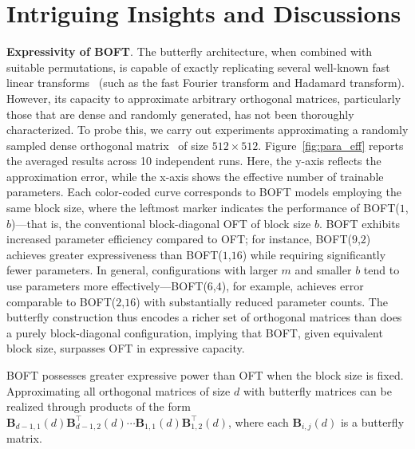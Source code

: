 \section{Intriguing Insights and Discussions}

\textbf{Expressivity of BOFT}. The butterfly architecture, when combined with suitable permutations, is capable of exactly replicating several well-known fast linear transforms~\cite{dao2019learning,dao2019kaleidoscope} (such as the fast Fourier transform and Hadamard transform). However, its capacity to approximate arbitrary orthogonal matrices, particularly those that are dense and randomly generated, has not been thoroughly characterized. To probe this, we carry out experiments approximating a randomly sampled dense orthogonal matrix~\cite{anderson1987generation} of size $512\times 512$. Figure~\ref{fig:para_eff} reports the averaged results across 10 independent runs. Here, the y-axis reflects the approximation error, while the x-axis shows the effective number of trainable parameters. Each color-coded curve corresponds to BOFT models employing the same block size, where the leftmost marker indicates the performance of BOFT($1$,$b$)—that is, the conventional block-diagonal OFT of block size $b$. BOFT exhibits increased parameter efficiency compared to OFT; for instance, BOFT($9$,$2$) achieves greater expressiveness than BOFT($1$,$16$) while requiring significantly fewer parameters. In general, configurations with larger $m$ and smaller $b$ tend to use parameters more effectively—BOFT($6$,$4$), for example, achieves error comparable to BOFT($2$,$16$) with substantially reduced parameter counts. The butterfly construction thus encodes a richer set of orthogonal matrices than does a purely block-diagonal configuration, implying that BOFT, given equivalent block size, surpasses OFT in expressive capacity.

\begin{theorem}\label{thm:exp_boft}
    BOFT possesses greater expressive power than OFT when the block size is fixed. Approximating all orthogonal matrices of size $d$ with butterfly matrices can be realized through products of the form $\bm{B}_{d-1,1}(d)\bm{B}^\top_{d-1,2}(d)\cdots\bm{B}_{1,1}(d)\bm{B}^\top_{1,2}(d)$, where each $\bm{B}_{i,j}(d)$ is a butterfly matrix.
\end{theorem}


